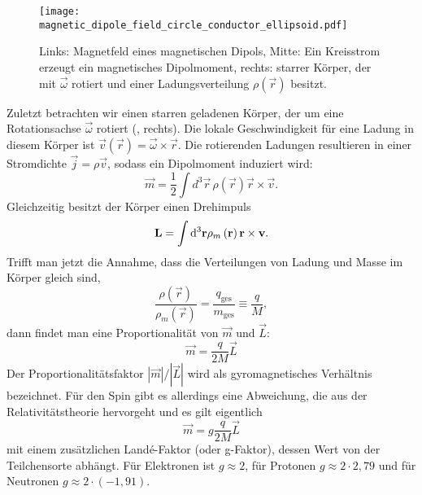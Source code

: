 \begin{figure}[htb]
	\centering
	\texttt{[image: magnetic\_dipole\_field\_circle\_conductor\_ellipsoid.pdf]}
	\caption{Links: Magnetfeld eines magnetischen Dipols, Mitte: Ein Kreisstrom erzeugt ein magnetisches Dipolmoment, rechts: starrer Körper, der mit $\vec\omega$ rotiert und einer Ladungsverteilung $\rho(\vec r)$ besitzt. }
	\label{fig:magnetic_dipole_field_circle_conductor_ellipsoid}
\end{figure}

Zuletzt betrachten wir einen starren geladenen Körper, der um eine Rotationsachse $\vec {\omega }$ rotiert (, rechts). Die lokale Geschwindigkeit für eine Ladung in diesem Körper ist $\vec {v}\left(\vec {r}\right)=\vec {\omega }\times \vec {r}$. Die rotierenden Ladungen resultieren in einer Stromdichte $\vec {j}=\rho \vec {v}$, sodass ein Dipolmoment induziert wird:
\begin{equation*}
	\vec {m}=\frac{1}{2}\int d^{3}\vec {r}\,\rho \left(\vec {r}\right)\vec {r}\times \vec {v}.
\end{equation*}
Gleichzeitig besitzt der Körper einen Drehimpuls
\begin{equation*}
	\mathbf{L}=\int \mathop{}\!\mathrm{d} ^{3}\mathbf{r}\rho _{m}\left(\mathbf{r}\right)\mathbf{r}\times \mathbf{v}.
\end{equation*}
Trifft man jetzt die Annahme, dass die Verteilungen von Ladung und Masse im Körper gleich sind,
\begin{equation*}
	\frac{\rho \left(\vec {r}\right)}{\rho _{m}\left(\vec {r}\right)}=\frac{q_{\mathrm{ges}}}{m_{\mathrm{ges}}}\equiv \frac{q}{M},
\end{equation*}
dann findet man eine Proportionalität von $\vec {m}$ und $\vec {L}$:
\begin{equation*}
	\vec {m}=\frac{q}{2M}\vec {L}
\end{equation*}
Der Proportionalitätsfaktor $\left| \vec {m}\right| /\left| \vec {L}\right| $ wird als gyromagnetisches Verhältnis bezeichnet. Für den Spin gibt es allerdings eine Abweichung, die aus der Relativitätstheorie hervorgeht und es gilt eigentlich
\begin{equation*}
	\vec {m}=g\frac{q}{2M}\vec {L}
\end{equation*}
mit einem zusätzlichen Landé-Faktor (oder g-Faktor), dessen Wert von der Teilchensorte abhängt. Für Elektronen ist $g\approx 2$, für Protonen $g\approx 2\cdot 2,79$ und für Neutronen $g\approx 2\cdot \left(-1,91\right)$.

